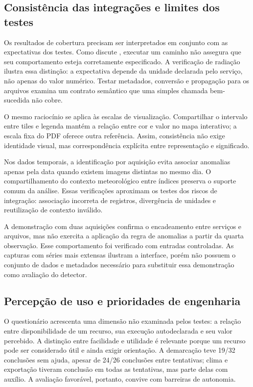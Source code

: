 \subsection{Consistência das integrações e limites dos testes}

Os resultados de cobertura precisam ser interpretados em conjunto com as expectativas dos testes. Como discute \citet{BENDER2020}, executar um caminho não assegura que seu comportamento esteja corretamente especificado. A verificação de radiação ilustra essa distinção: a expectativa depende da unidade declarada pelo serviço, não apenas do valor numérico. Testar metadados, conversão e propagação para os arquivos examina um contrato semântico que uma simples chamada bem-sucedida não cobre.

O mesmo raciocínio se aplica às escalas de visualização. Compartilhar o intervalo entre tiles e legenda mantém a relação entre cor e valor no mapa interativo; a escala fixa do PDF oferece outra referência. Assim, consistência não exige identidade visual, mas correspondência explícita entre representação e significado.

Nos dados temporais, a identificação por aquisição evita associar anomalias apenas pela data quando existem imagens distintas no mesmo dia. O compartilhamento do contexto meteorológico entre índices preserva o suporte comum da análise. Essas verificações aproximam os testes dos riscos de integração: associação incorreta de registros, divergência de unidades e reutilização de contexto inválido.

A demonstração com duas aquisições confirma o encadeamento entre serviços e arquivos, mas não exercita a aplicação da regra de anomalias a partir da quarta observação. Esse comportamento foi verificado com entradas controladas. As capturas com séries mais extensas ilustram a interface, porém não possuem o conjunto de dados e metadados necessário para substituir essa demonstração como avaliação do detector.

\subsection{Percepção de uso e prioridades de engenharia}

O questionário acrescenta uma dimensão não examinada pelos testes: a relação entre disponibilidade de um recurso, sua execução autodeclarada e seu valor percebido. A distinção entre facilidade e utilidade \citep{DAVIS1989} é relevante porque um recurso pode ser considerado útil e ainda exigir orientação. A demarcação teve 19/32 conclusões sem ajuda, apesar de 24/26 conclusões entre tentativas; clima e exportação tiveram conclusão em todas as tentativas, mas parte delas com auxílio. A avaliação favorável, portanto, convive com barreiras de autonomia.

